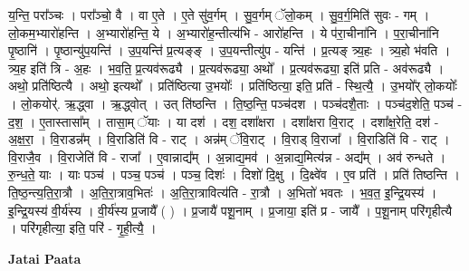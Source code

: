 \documentclass[17pt]{extarticle}
\begin{document}
य॒न्ति॒ परा᳚ञ्चः । परा᳚ञ्चो॒ वै । वा ए॒ते । ए॒ते सु॑व॒र्गम् । सु॒व॒र्गम् ॅलो॒कम् । सु॒व॒र्ग॒मिति॑ सुवः - गम् । लो॒कम॒भ्यारो॑हन्ति । अ॒भ्यारो॑हन्ति॒ ये । अ॒भ्यारो॑ह॒न्तीत्य॑भि - आरो॑हन्ति । ये प॑रा॒चीना॑नि । प॒रा॒चीना॑नि पृ॒ष्ठानि॑ । पृ॒ष्ठान्यु॑प॒यन्ति॑ । उ॒प॒यन्ति॑ प्र॒त्यङ्‍ङ् । उ॒प॒यन्तीत्यु॑प - यन्ति॑ । प्र॒त्यङ्‍ त्र्य॒हः । त्र्य॒हो भ॑वति । त्र्य॒ह इति॑ त्रि - अ॒हः । भ॒व॒ति॒ प्र॒त्यव॑रूढ्यै । प्र॒त्यव॑रूढ्या॒ अथो᳚ । प्र॒त्यव॑रूढ्या॒ इति॑ प्रति - अव॑रूढ्यै । अथो॒ प्रति॑ष्ठित्यै । अथो॒ इत्यथो᳚ । प्रति॑ष्ठित्या उ॒भयोः᳚ । प्रति॑ष्ठित्या॒ इति॒ प्रति॑ - स्थि॒त्यै॒ । उ॒भयो᳚र् लो॒कयोः᳚ । लो॒कयोर्॑. ऋ॒द्ध्वा । ऋ॒द्ध्वोत् । उत् ति॑ष्ठन्ति । ति॒ष्ठ॒न्ति॒ पञ्च॑दश । पञ्च॑दशै॒ताः । पञ्च॑द॒शेति॒ पञ्च॑ - द॒श॒ । ए॒तास्तासा᳚म् । तासा॒म् ॅयाः । या दश॑ । दश॒ दशा᳚क्षरा । दशा᳚क्षरा वि॒राट् । दशा᳚क्ष॒रेति॒ दश॑ - अ॒क्ष॒रा॒ । वि॒राडन्न᳚म् । वि॒राडिति॑ वि - राट् । अन्न॑म् ॅवि॒राट् । वि॒राड् वि॒राजा᳚ । वि॒राडिति॑ वि - राट् । वि॒राजै॒व । वि॒राजेति॑ वि - राजा᳚ । ए॒वान्नाद्य᳚म् । अ॒न्नाद्य॒मव॑ । अ॒न्नाद्य॒मित्य॑न्न - अद्य᳚म् । अव॑ रुन्धते । रु॒न्ध॒ते॒ याः । याः पञ्च॑ । पञ्च॒ पञ्च॑ । पञ्च॒ दिशः॑ । दिशो॑ दि॒क्षु । दि॒क्ष्वे॑व । ए॒व प्रति॑ । प्रति॑ तिष्ठन्ति । ति॒ष्ठ॒न्त्य॒ति॒रा॒त्रौ । अ॒ति॒रा॒त्राव॒भितः॑ । अ॒ति॒रा॒त्रावित्य॑ति - रा॒त्रौ । अ॒भितो॑ भवतः । भ॒व॒त॒ इ॒न्द्रि॒यस्य॑ । इ॒न्द्रि॒यस्य॑ वी॒र्य॑स्य । वी॒र्य॑स्य प्र॒जायै᳚ ( ) । प्र॒जायै॑ पशू॒नाम् । प्र॒जाया॒ इति॑ प्र - जायै᳚ । प॒शू॒नाम् परि॑गृहीत्यै । परि॑गृहीत्या॒ इति॒ परि॑ - गृ॒ही॒त्यै॒ । \newline

\textbf{Jatai Paata} \newline
\end{document}
